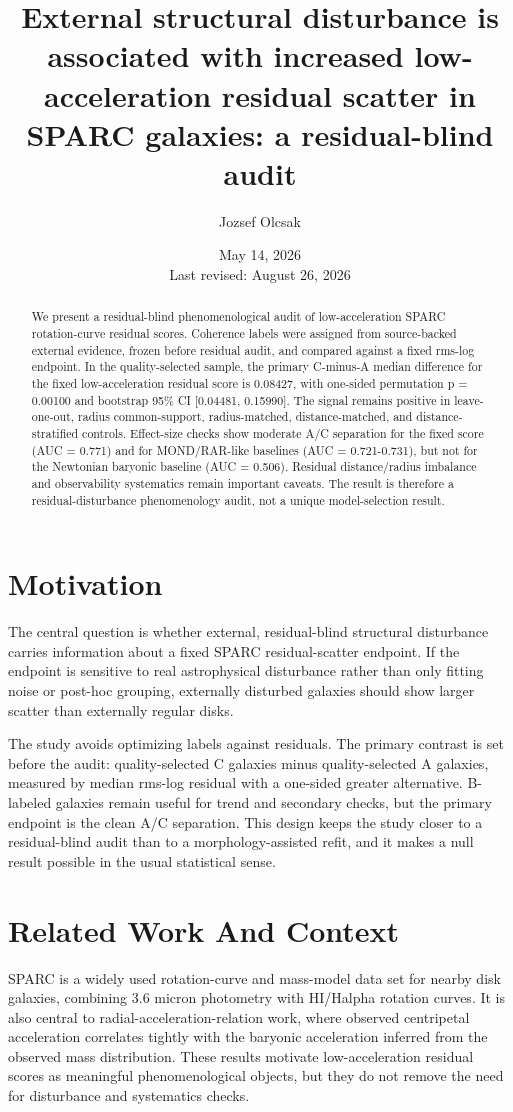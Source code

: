 \documentclass[11pt]{article}
\title{External structural disturbance is associated with increased low-acceleration residual scatter in SPARC galaxies: a residual-blind audit}
\author{Jozsef Olcsak}
\date{May 14, 2026\\Last revised: August 26, 2026}
\begin{document}
\maketitle
\begin{abstract}
We present a residual-blind phenomenological audit of low-acceleration SPARC rotation-curve residual scores. Coherence labels were assigned from source-backed external evidence, frozen before residual audit, and compared against a fixed rms-log endpoint. In the quality-selected sample, the primary C-minus-A median difference for the fixed low-acceleration residual score is 0.08427, with one-sided permutation p = 0.00100 and bootstrap 95\% CI [0.04481, 0.15990]. The signal remains positive in leave-one-out, radius common-support, radius-matched, distance-matched, and distance-stratified controls. Effect-size checks show moderate A/C separation for the fixed score (AUC = 0.771) and for MOND/RAR-like baselines (AUC = 0.721-0.731), but not for the Newtonian baryonic baseline (AUC = 0.506). Residual distance/radius imbalance and observability systematics remain important caveats. The result is therefore a residual-disturbance phenomenology audit, not a unique model-selection result.

\end{abstract}
\section{Motivation}
The central question is whether external, residual-blind structural disturbance carries information about a fixed SPARC residual-scatter endpoint. If the endpoint is sensitive to real astrophysical disturbance rather than only fitting noise or post-hoc grouping, externally disturbed galaxies should show larger scatter than externally regular disks.

The study avoids optimizing labels against residuals. The primary contrast is set before the audit: quality-selected C galaxies minus quality-selected A galaxies, measured by median rms-log residual with a one-sided greater alternative. B-labeled galaxies remain useful for trend and secondary checks, but the primary endpoint is the clean A/C separation. This design keeps the study closer to a residual-blind audit than to a morphology-assisted refit, and it makes a null result possible in the usual statistical sense.

\section{Related Work And Context}
SPARC is a widely used rotation-curve and mass-model data set for nearby disk galaxies, combining 3.6 micron photometry with HI/Halpha rotation curves. It is also central to radial-acceleration-relation work, where observed centripetal acceleration correlates tightly with the baryonic acceleration inferred from the observed mass distribution. These results motivate low-acceleration residual scores as meaningful phenomenological objects, but they do not remove the need for disturbance and systematics checks.
\end{document}
